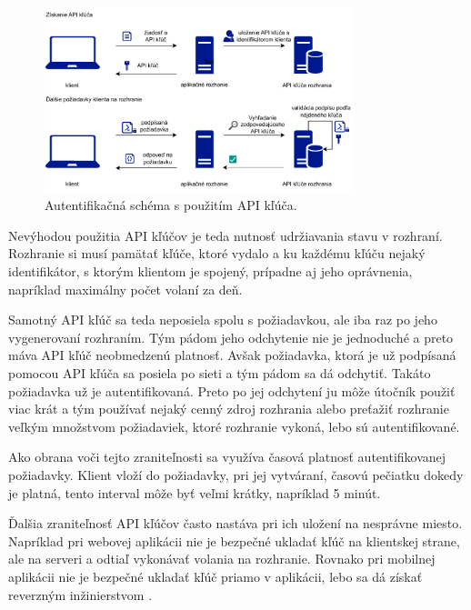 \begin{figure}
    \centerline{\includegraphics[width=0.8\textwidth]{images/api_key_schema}}
    \caption[Schéma s použitím API kľúča]{Autentifikačná schéma s použitím API kľúča.}
    \label{fig:api_key_schema}
\end{figure}

Nevýhodou použitia API kľúčov je teda nutnosť udržiavania stavu v rozhraní. Rozhranie si musí pamätať kľúče, ktoré vydalo a ku každému kľúču nejaký identifikátor, s ktorým klientom je spojený, prípadne aj jeho oprávnenia, napríklad maximálny počet volaní za deň.

Samotný API kľúč sa teda neposiela spolu s požiadavkou, ale iba raz po jeho vygenerovaní rozhraním. Tým pádom jeho odchytenie nie je jednoduché a preto máva API kľúč neobmedzenú platnosť. Avšak požiadavka, ktorá je už podpísaná pomocou API kľúča sa posiela po sieti a tým pádom sa dá odchytiť. Takáto požiadavka už je autentifikovaná. Preto po jej odchytení ju môže útočník použiť viac krát a tým používať nejaký cenný zdroj rozhrania alebo preťažiť rozhranie veľkým množstvom požiadaviek, ktoré rozhranie vykoná, lebo sú autentifikované.

Ako obrana voči tejto zraniteľnosti sa využíva časová platnosť autentifikovanej požiadavky. Klient vloží do požiadavky, pri jej vytváraní, časovú pečiatku dokedy je platná, tento interval môže byť veľmi krátky, napríklad 5 minút.

Ďalšia zraniteľnosť API kľúčov často nastáva pri ich uložení na nesprávne miesto. Napríklad pri webovej aplikácii nie je bezpečné ukladať kľúč na klientskej strane, ale na serveri a odtiaľ vykonávať volania na rozhranie. Rovnako pri mobilnej aplikácii nie je bezpečné ukladať kľúč priamo v aplikácii, lebo sa dá získať reverzným inžinierstvom \cite{api_key_vulnerabilities}.



